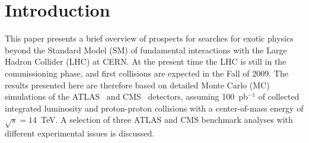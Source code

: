 \documentclass{cimento}
\begin{document}
\section{Introduction}
%
%
This paper presents a brief overview of prospects for searches for exotic physics 
beyond the Standard Model (SM) of fundamental interactions with the Large Hadron Collider (LHC) at CERN.
At the present time the LHC is still in the commissioning phase, 
and first collisions are expected in the Fall of 2009.
The results presented here are therefore based on detailed 
Monte Carlo (MC) simulations of the ATLAS~\cite{Aad:2009wy} and 
CMS~\cite{Bayatian:2006zz} detectors, assuming 100~pb$^{-1}$ 
of collected integrated luminosity and proton-proton collisions 
with a center-of-mass energy of $\sqrt{s} = 14$~TeV. 
A selection of three ATLAS and CMS benchmark analyses with different 
experimental issues is discussed. 
\end{document}
